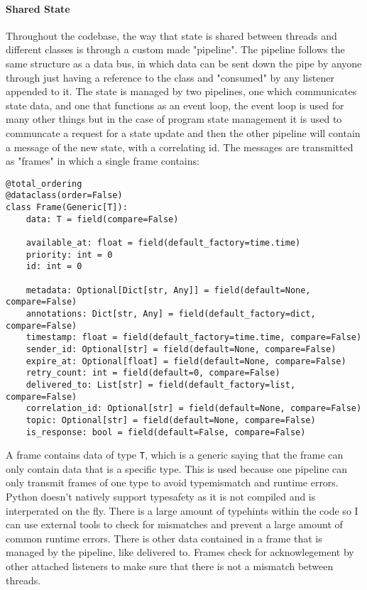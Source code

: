 \documentclass{article}
\begin{document}
\paragraph{Shared State}
\label{pipeline}
Throughout the codebase, the way that state is shared between threads and different classes is through a custom made "pipeline". The pipeline follows the same structure as a data bus, in which data can be sent down the pipe by anyone through just having a reference to the class and "consumed" by any listener appended to it. The state is managed by two pipelines, one which communicates state data, and one that functions as an event loop, the event loop is used for many other things but in the case of program state management it is used to communcate a request for a state update and then the other pipeline will contain a message of the new state, with a correlating id. The messages are transmitted as "frames" in which a single frame contains:

\begin{verbatim}
@total_ordering
@dataclass(order=False)
class Frame(Generic[T]):
    data: T = field(compare=False)

    available_at: float = field(default_factory=time.time)  
    priority: int = 0  
    id: int = 0  

    metadata: Optional[Dict[str, Any]] = field(default=None, compare=False)
    annotations: Dict[str, Any] = field(default_factory=dict, compare=False)
    timestamp: float = field(default_factory=time.time, compare=False)
    sender_id: Optional[str] = field(default=None, compare=False)
    expire_at: Optional[float] = field(default=None, compare=False)
    retry_count: int = field(default=0, compare=False)
    delivered_to: List[str] = field(default_factory=list, compare=False)
    correlation_id: Optional[str] = field(default=None, compare=False)
    topic: Optional[str] = field(default=None, compare=False)
    is_response: bool = field(default=False, compare=False)
\end{verbatim}

\noindent A frame contains data of type \verb|T|, which is a generic saying that the frame can only contain data that is a specific type. This is used because one pipeline can only transmit frames of one type to avoid typemismatch and runtime errors. Python doesn't natively support typesafety as it is not compiled and is interperated on the fly. There is a large amount of typehints within the code so I can use external tools to check for mismatches and prevent a large amount of common runtime errors. There is other data contained in a frame that is managed by the pipeline, like delivered to. Frames check for acknowlegement by other attached listeners to make sure that there is not a mismatch between threads.
\end{document}
